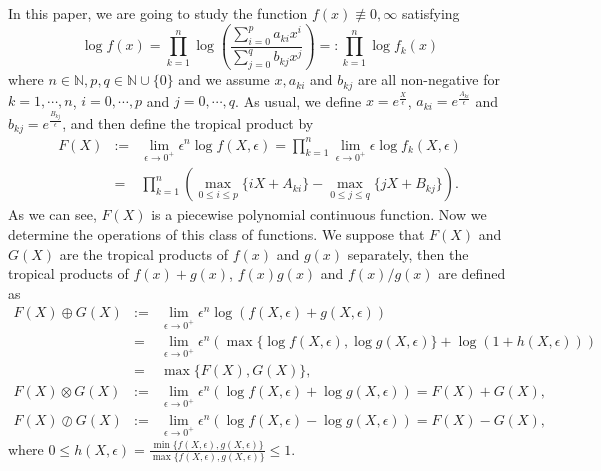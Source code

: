 \documentclass{article}
\begin{document}
In this paper, we are going to study the function $f(x)\not\equiv 0, \infty$ satisfying
\begin{equation*}
    \log f(x)=\prod_{k=1}^{n}\log \left(\frac{\sum_{i=0}^{p}a_{ki}x^{i}}{\sum_{j=0}^{q}b_{kj}x^{j}}\right)=:\prod_{k=1}^{n}\log f_{k}(x)
\end{equation*}
where $ n\in\mathbb{N}, p, q\in \mathbb{N}\cup\{0\}$ and we assume $x, a_{ki}$ and $b_{kj}$ are all non-negative for $k=1, \cdots, n$, $i=0, \cdots, p$ and $j=0, \cdots, q$. As usual, we define $x=e^{\frac{X}{\epsilon}}$, $a_{ki}=e^{\frac{A_{ki}}{\epsilon}}$ and $b_{kj}=e^{\frac{B_{kj}}{\epsilon}}$, and then define the tropical product by
\begin{eqnarray*}
    F(X)&:=&\lim\limits_{\epsilon\rightarrow 0^{+}}\epsilon^{n}\log f(X, \epsilon)=\prod_{k=1}^{n}\lim\limits_{\epsilon\rightarrow 0^{+}}\epsilon\log f_{k}(X, \epsilon)\\
    &=&\prod_{k=1}^{n}\left(\max\limits_{0\leq i\leq p}\{iX+A_{ki}\}-\max\limits_{0\leq j\leq q}\{jX+B_{kj}\}\right).
\end{eqnarray*}
As we can see, $F(X)$ is a piecewise polynomial continuous function. Now we determine the operations of this class of functions. We suppose that $F(X)$ and $G(X)$ are the tropical products of $f(x)$ and $g(x)$ separately, then the tropical products of $f(x)+g(x)$, $f(x)g(x)$ and $f(x)/g(x)$ are defined as
\begin{eqnarray*}
    F(X)\oplus G(X)&:=&\lim\limits_{\epsilon\rightarrow 0^{+}}\epsilon^{n}\log(f(X, \epsilon)+g(X, \epsilon))\\
    &=&\lim\limits_{\epsilon\rightarrow 0^{+}}\epsilon^{n}\left(\max\{\log f(X, \epsilon), \log g(X, \epsilon)\}+\log(1+h(X, \epsilon))\right)\\
    &=& \max\{F(X), G(X)\},\\
    F(X)\otimes G(X)&:=&\lim\limits_{\epsilon\rightarrow 0^{+}}\epsilon^{n}(\log f(X, \epsilon)+\log g(X, \epsilon))=F(X)+G(X),\\
    F(X)\oslash G(X)&:=&\lim\limits_{\epsilon\rightarrow 0^{+}}\epsilon^{n}(\log f(X, \epsilon)-\log g(X, \epsilon))=F(X)-G(X),
\end{eqnarray*}
where $0\leq h(X, \epsilon)=\frac{\min\{ f(X, \epsilon),  g(X, \epsilon)\}}{\max\{ f(X, \epsilon), g(X, \epsilon)\}} \leq 1$.  
\end{document}
